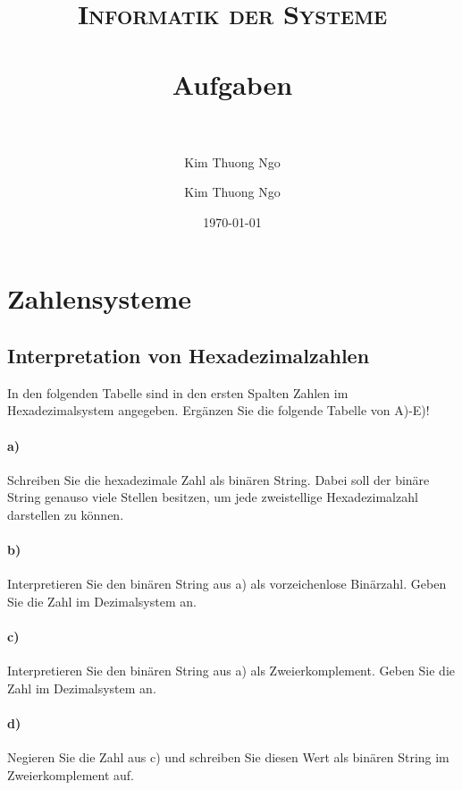 \documentclass[paper=a4, fontsize=11pt]{scrartcl}
\author{Kim Thuong Ngo}
\title{	
\normalfont \normalsize 
\textsc{Informatik der Systeme} \\ [25pt] 
\horrule{0.5pt} \\[0.4cm] 
\huge Aufgaben \\ 
\horrule{2pt} \\[0.5cm] 
}
\author{Kim Thuong Ngo}
\date{\normalsize\today}
\numberwithin{equation}{section}
\numberwithin{figure}{section}
\numberwithin{table}{section}
\begin{document}
\maketitle 

\newpage

\tableofcontents

\newpage


\section{Zahlensysteme}

\subsection{Interpretation von Hexadezimalzahlen}

In den folgenden Tabelle sind in den ersten Spalten Zahlen im Hexadezimalsystem angegeben. Ergänzen Sie die folgende Tabelle von A)-E)! \\

\paragraph{a)}
Schreiben Sie die hexadezimale Zahl als binären String. Dabei soll der binäre String genauso viele Stellen besitzen, um jede zweistellige Hexadezimalzahl darstellen zu können. \\

\paragraph{b)}
Interpretieren Sie den binären String aus a) als vorzeichenlose Binärzahl. Geben Sie die Zahl im Dezimalsystem an. \\

\paragraph{c)}
Interpretieren Sie den binären String aus a) als Zweierkomplement. Geben Sie die Zahl im Dezimalsystem an. \\

\paragraph{d)}
Negieren Sie die Zahl aus c) und schreiben Sie diesen Wert als binären String im Zweierkomplement auf. \\
\end{document}
